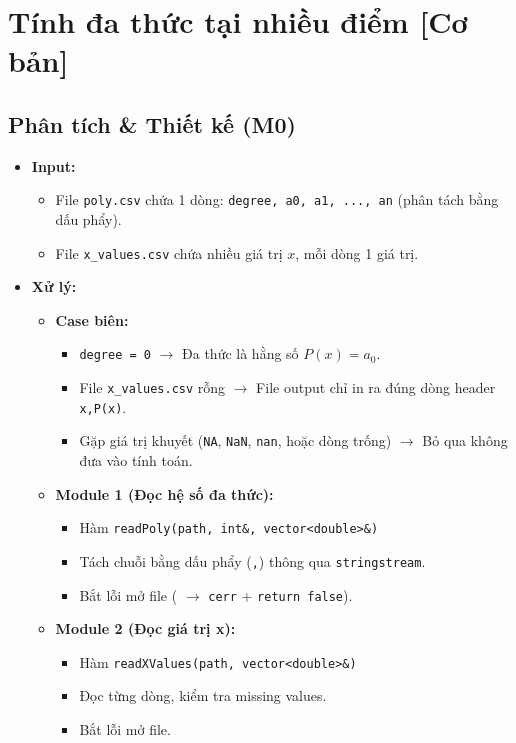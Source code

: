 \section{Tính đa thức tại nhiều điểm [Cơ bản]}
\subsection{Phân tích \& Thiết kế (M0)}
    \begin{itemize}
    \item \textbf{Input:}
        \begin{itemize}
            \item File \texttt{poly.csv} chứa 1 dòng: \texttt{degree, a0, a1, ..., an} (phân tách bằng dấu phẩy).
            \item File \texttt{x\_values.csv} chứa nhiều giá trị $x$, mỗi dòng 1 giá trị.
        \end{itemize}

    \item \textbf{Xử lý:}
        \begin{itemize}
            \item \textbf{Case biên:}
            \begin{itemize}
                \item \texttt{degree = 0} $\rightarrow$ Đa thức là hằng số $P(x) = a_0$.
                \item File \texttt{x\_values.csv} rỗng $\rightarrow$ File output chỉ in ra đúng dòng header \texttt{x,P(x)}.
                \item Gặp giá trị khuyết (\texttt{NA}, \texttt{NaN}, \texttt{nan}, hoặc dòng trống) $\rightarrow$ Bỏ qua không đưa vào tính toán.
            \end{itemize}
            
            \item \textbf{Module 1 (Đọc hệ số đa thức):}
            \begin{itemize}
                \item Hàm \texttt{readPoly(path, int\&, vector<double>\&)}
                \item Tách chuỗi bằng dấu phẩy (\texttt{,}) thông qua \texttt{stringstream}.
                \item Bắt lỗi mở file ( $\rightarrow$ \texttt{cerr} + \texttt{return false}).
            \end{itemize}

            \item \textbf{Module 2 (Đọc giá trị x):}
            \begin{itemize}
                \item Hàm \texttt{readXValues(path, vector<double>\&)}
                \item Đọc từng dòng, kiểm tra missing values.
                \item Bắt lỗi mở file.
            \end{itemize}
            

\end{itemize}
\end{itemize}
